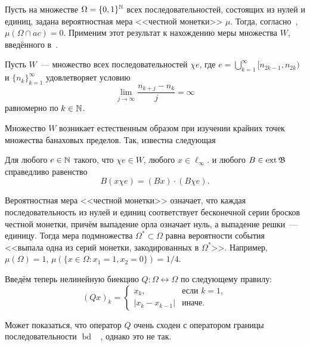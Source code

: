 \label{par:ac_W_measure}

Пусть на множестве $\Omega=\{0,1\}^{\mathbb{N}}$ всех последовательностей, состоящих из нулей и единиц,
задана вероятностная мера <<честной монетки>> $\mu$.
Тогда, согласно~\cite{connor1990almost}, $\mu(\Omega\cap ac)=0$.
Применим этот результат к нахождению меры множества $W$,
введённого в~\cite[\S 5]{Semenov2014geomprops}.

Пусть $W$~--- множество всех последовательностей $\chi e$, где $e =\bigcup_{k=1}^{\infty} [n_{2k-1}, n_{2k} )$
и $\{n_k \}_{k=1}^{\infty}$
удовлетворяет условию
\begin{equation}
	\label{eq:lim_j_n_kj_measure}
	\lim_{j\to\infty}\frac{n_{k+j} - n_k}{j} = \infty
\end{equation}
равномерно по $k \in \mathbb{N}$.

Множество $W$ возникает естественным образом при изучении крайних точек множества банаховых пределов.
Так, известна следующая
\begin{lemma}
	Для любого $e\in\mathbb{N}$ такого, что $\chi e \in W$,
	любого $x\in\ell_\infty$.
	и любого $B\in\operatorname{ext}\mathfrak{B}$
	справедливо равенство
	\begin{equation}
		B(x\chi e) = (Bx) \cdot (B\chi e)
		.
	\end{equation}
\end{lemma}


Вероятностная мера <<честной монетки>> означает,
что каждая последовательность из нулей и единиц соответствует бесконечной серии
бросков честной монетки, причём выпадение орла означает нуль, а выпадение решки~--- единицу.
Тогда мера подмножества $\Omega^*\subset\Omega$
равна вероятности события <<выпала одна из серий монетки, закодированных в $\Omega^*$>>.
Например, $\mu(\Omega)=1$, $\mu(\{x\in\Omega:x_1=1, x_2=0\})=1/4$.

Введём теперь нелинейную биекцию $Q:\Omega\leftrightarrow\Omega$ по следующему правилу:
\begin{equation}
	(Qx)_k = \begin{cases}
		x_k, &\mbox{если~} k = 1,
		\\
		|x_k-x_{k-1}|&\mbox{иначе}.
	\end{cases}
\end{equation}

\begin{remark}
	Может показаться, что оператор $Q$ очень сходен с оператором границы последовательности $\operatorname{bd}$
	~\cite{keller1992invariant},
	однако это не так.
\end{remark}

